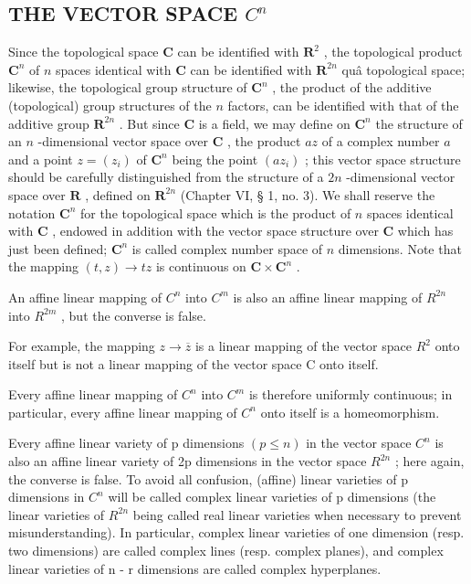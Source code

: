 \subsection{\texorpdfstring{THE VECTOR SPACE \(C^{n}\)}{THE VECTOR SPACE C TO THE N}}

Since the topological space \(\mathbf{C}\) can be identified with \(\mathbf{R}^2\) , the topological product \(\mathbf{C}^n\) of \(n\) spaces identical with \(\mathbf{C}\) can be identified with \(\mathbf{R}^{2n}\) quâ topological space; likewise, the topological group structure of \(\mathbf{C}^n\) , the product of the additive (topological) group structures of the \(n\) factors, can be identified with that of the additive group \(\mathbf{R}^{2n}\) . But since \(\mathbf{C}\) is a field, we may define on \(\mathbf{C}^n\) the structure of an \(n\) -dimensional vector space over \(\mathbf{C}\) , the product \(az\) of a complex number \(a\) and a point \(z = (z_i)\) of \(\mathbf{C}^n\) being the point \((az_i)\) ; this vector space structure should be carefully distinguished from the structure of a \(2n\) -dimensional vector space over \(\mathbf{R}\) , defined on \(\mathbf{R}^{2n}\) (Chapter VI, § 1, no. 3). We shall reserve the notation \(\mathbf{C}^n\) for the topological space which is the product of \(n\) spaces identical with \(\mathbf{C}\) , endowed in addition with the vector space structure over \(\mathbf{C}\) which has just been defined; \(\mathbf{C}^n\) is called complex number space of \(n\) dimensions. Note that the mapping \((t, z) \to tz\) is continuous on \(\mathbf{C} \times \mathbf{C}^n\) .

An affine linear mapping of \(C^{n}\) into \(C^{m}\) is also an affine linear mapping of \(R^{2n}\) into \(R^{2m}\) , but the converse is false.

For example, the mapping \(z \rightarrow \overline{z}\) is a linear mapping of the vector space \(R^{2}\) onto itself but is not a linear mapping of the vector space C onto itself.

Every affine linear mapping of \(C^{n}\) into \(C^{m}\) is therefore uniformly continuous; in particular, every affine linear mapping of \(C^{n}\) onto itself is a homeomorphism.

Every affine linear variety of p dimensions \((p \leqslant n)\) in the vector space \(C^{n}\) is also an affine linear variety of 2p dimensions in the vector space \(R^{2n}\) ; here again, the converse is false. To avoid all confusion, (affine) linear varieties of p dimensions in \(C^{n}\) will be called complex linear varieties of p dimensions (the linear varieties of \(R^{2n}\) being called real linear varieties when necessary to prevent misunderstanding). In particular, complex linear varieties of one dimension (resp. two dimensions) are called complex lines (resp. complex planes), and complex linear varieties of n - r dimensions are called complex hyperplanes.

